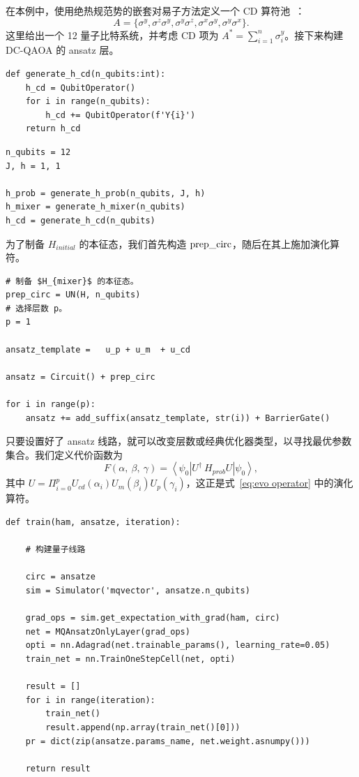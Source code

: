 在本例中，使用绝热规范势的嵌套对易子方法定义一个 CD 算符池~\cite{PhysRevResearch.6.013147}：
$$A = \{\sigma^{y},\sigma^{z}\sigma^{y}, \sigma^{y}\sigma^{z}, \sigma^{x}\sigma^{y}, \sigma^{y}\sigma^{x} \}.$$
这里给出一个 12 量子比特系统，并考虑 CD 项为 $A^{*} = \sum_{i=1}^{n}\sigma_{i}^{y}$。接下来构建 DC-QAOA 的 ansatz 层。
\begin{lstlisting}
def generate_h_cd(n_qubits:int):
    h_cd = QubitOperator()
    for i in range(n_qubits):
        h_cd += QubitOperator(f'Y{i}')
    return h_cd
\end{lstlisting}

\begin{lstlisting}
n_qubits = 12
J, h = 1, 1

h_prob = generate_h_prob(n_qubits, J, h)
h_mixer = generate_h_mixer(n_qubits)
h_cd = generate_h_cd(n_qubits)
\end{lstlisting}

为了制备 $H_{initial}$ 的本征态，我们首先构造 ${\rm prep\_circ}$，随后在其上施加演化算符。
\begin{lstlisting}
# 制备 $H_{mixer}$ 的本征态。
prep_circ = UN(H, n_qubits)
# 选择层数 p。
p = 1

ansatz_template =   u_p + u_m  + u_cd

ansatz = Circuit() + prep_circ

for i in range(p):
    ansatz += add_suffix(ansatz_template, str(i)) + BarrierGate()
\end{lstlisting}

只要设置好了 ansatz 线路，就可以改变层数或经典优化器类型，以寻找最优参数集合。我们定义代价函数为
\begin{equation}
    F(\alpha,~\beta,~\gamma) = \left<\psi_0\right|U^{\dagger}\ H_{prob} U\left|\psi_0\right>,
\end{equation}
其中 $U = \Pi_{i=0}^p U_{cd}(\alpha_i)U_m(\beta_i)U_p(\gamma_i)$，这正是式~\ref{eq:evo operator} 中的演化算符。
\begin{lstlisting}
def train(ham, ansatze, iteration):

    # 构建量子线路

    circ = ansatze
    sim = Simulator('mqvector', ansatze.n_qubits)

    grad_ops = sim.get_expectation_with_grad(ham, circ)
    net = MQAnsatzOnlyLayer(grad_ops)
    opti = nn.Adagrad(net.trainable_params(), learning_rate=0.05)
    train_net = nn.TrainOneStepCell(net, opti)

    result = []
    for i in range(iteration):
        train_net()
        result.append(np.array(train_net()[0]))
    pr = dict(zip(ansatze.params_name, net.weight.asnumpy()))

    return result
\end{lstlisting}

